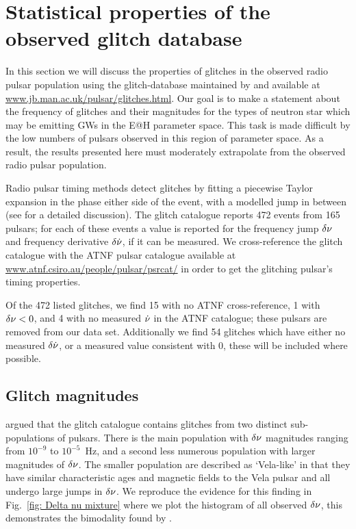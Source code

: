 \documentclass[../full_thesis/full_thesis.tex]{subfiles}
\begin{document}
\section{Statistical properties of the observed glitch database}
\label{sec: statistical properties}
In this section we will discuss the properties of glitches in the observed
radio pulsar population using the glitch-database maintained by \citet{Espinoza2011}
and available at \url{www.jb.man.ac.uk/pulsar/glitches.html}.
Our goal is to make a statement about the frequency of glitches and their
magnitudes for the types of neutron star which may be emitting GWs in the E@H
parameter space. This task is made difficult by the low numbers of pulsars observed
in this region of parameter space. As a result, the results presented here must
moderately extrapolate from the observed radio pulsar population.

Radio pulsar timing methods detect glitches by fitting a piecewise Taylor expansion in
the phase either side of the event, with a modelled jump in between (see
\citet{Edwards2006} for a detailed discussion). The glitch catalogue
\citep{Espinoza2011} reports 472 events from 165 pulsars; for each of these
events a value is reported for the frequency jump $\delta\nu$ and frequency
derivative $\delta\dot{\nu}$, if it can be measured. We
cross-reference the glitch catalogue with the ATNF \citet{ATNF} pulsar
catalogue available at \url{www.atnf.csiro.au/people/pulsar/psrcat/} in order
to get the glitching pulsar's timing properties.

Of the 472 listed glitches, we find 15 with no ATNF cross-reference, 1 with
$\delta\nu < 0$, and 4 with no measured $\dot{\nu}$ in the ATNF catalogue; these
pulsars are removed from our data set. Additionally we find 54 glitches which
have either no measured $\delta\dot{\nu}$, or a measured value consistent with 0,
these will be included where possible.

\subsection{Glitch magnitudes}
\label{sec: observed glitch magnitude}

\citet{Espinoza2011} argued that the glitch catalogue contains glitches from
two distinct sub-populations of pulsars. There is the main population with
$\delta\nu$ magnitudes ranging from $10^{-9}$ to $10^{-5}$~Hz, and a second
less numerous population with larger magnitudes of $\delta\nu$. The smaller
population are described as `Vela-like' in that they have similar
characteristic ages and magnetic fields to the Vela pulsar and all undergo
large jumps in $\delta\nu$.  We reproduce the evidence for this finding in
Fig.~\ref{fig: Delta nu mixture} where we plot the histogram of all observed
$\delta\nu$, this demonstrates the bimodality found by \citet{Espinoza2011}.
\end{document}
